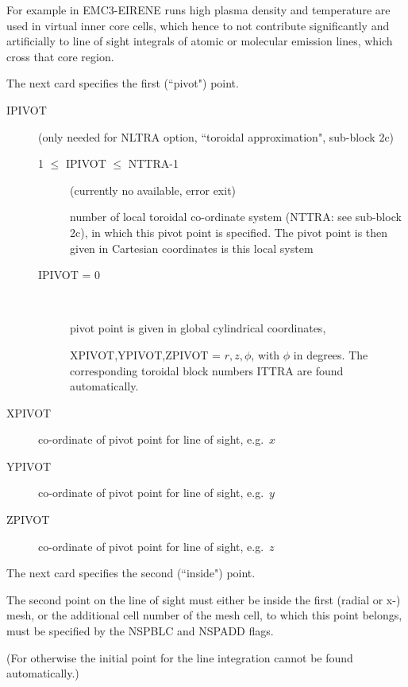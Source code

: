 For example in EMC3-EIRENE runs high plasma density and temperature are used in
virtual inner core cells, which hence to not contribute significantly and
artificially to line of sight integrals of atomic or molecular emission lines,
which cross that core region.

\medskip

The next card specifies the first (``pivot") point.

\begin{description}
  \item[IPIVOT] (only needed for NLTRA option, ``toroidal approximation",
        sub-block 2c)
        \begin{description}
          \item[1 $\leq$ IPIVOT $\leq$ NTTRA-1]
                (currently no available, error exit)

                number of local toroidal co-ordinate system (NTTRA: see sub-block 2c), in which
                this pivot point is specified.
                The pivot point is then given in Cartesian coordinates is this local system
          \item[IPIVOT = 0] ~

                pivot point is given in global cylindrical coordinates,

                XPIVOT,YPIVOT,ZPIVOT = $r,z,\phi$, with $\phi$ in degrees.
                The corresponding toroidal block numbers ITTRA are found automatically.
        \end{description}
  \item[XPIVOT]  co-ordinate of pivot point for line of sight,
        e.g.\ $x$
  \item[YPIVOT]  co-ordinate of pivot point for line of
        sight, e.g.\ $y$
  \item[ZPIVOT]  co-ordinate of pivot point for
        line of sight, e.g.\ $z$
\end{description}
The next card specifies the second
(``inside") point.

The second point on the line of sight must either be inside the first (radial
or x-) mesh, or the additional cell number of the mesh cell, to which this
point belongs, must be specified by the NSPBLC and NSPADD flags.

(For otherwise the initial point for the line integration cannot be found
automatically.)

